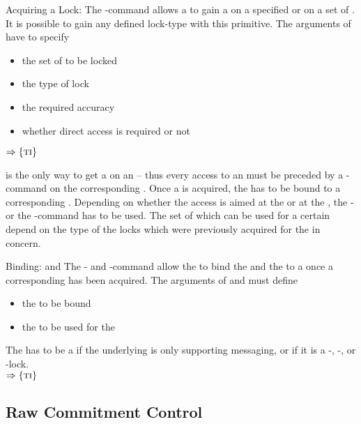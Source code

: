 \documentclass[a4paper, 12pt]{book}
\newcommand{\INTERFACE}[1]{$\Rightarrow\left\{#1\right\}$}
\begin{document}
\begin{requirement*}{Acquiring a Lock: \dbaiACQUIRE}
  The \dbaiACQUIRE-command allows a  to gain a  on a
  specified  or on a set of . It is possible to gain
  any defined lock-type with this primitive.
  The arguments of \dbaiACQUIRE have to specify 
  \begin{itemize}
  \item the set of  to be locked
  \item the type of lock
  \item the required accuracy 
  \item whether direct access is required or not
  \end{itemize}
  \INTERFACE{\TRANSACTION}
\end{requirement*}
%
\dbaiACQUIRE is the only way to get a  on an  -- thus
every access to an  must be preceded by a \dbaiACQUIRE-command on
the corresponding . 
%
Once a  is acquired, the  has to be bound to a
corresponding . Depending on whether the access is aimed at
the  or at the , the \dbaiBINDENC-
or the \dbaiBINDCFG-command has to be used.
%
The set of  which can be used for a certain  depend on
the type of the locks which were previously acquired for the  in
concern. 
%

\begin{requirement*}{Binding: \dbaiBINDENC and \dbaiBINDCFG}
  The \dbaiBINDENC- and \dbaiBINDCFG-command allow the  to bind the
   and the  to a 
  once a corresponding  has been acquired.
  The arguments of \dbaiBINDENC and \dbaiBINDCFG must define
  \begin{itemize}
  \item the  to be bound
  \item the  to be used for the 
  \end{itemize}
  The  has to be a  if the underlying 
  is only supporting messaging, or if it is a \UNLOCKED-, \CONCREAD-, or
  \CONCWRITE-lock.\\
  \INTERFACE{\TRANSACTION}
\end{requirement*}

\subsection{Raw Commitment Control}
\end{document}

